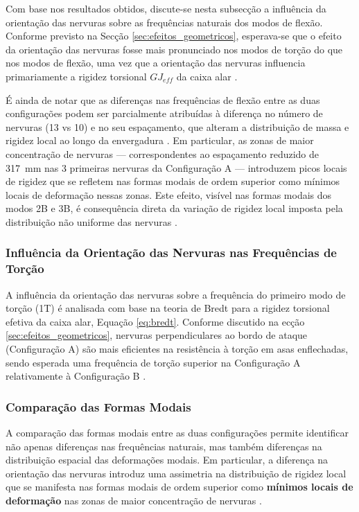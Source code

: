 \documentclass[a4paper,fleqn,noprintline]{cas-dc}
\begin{document}
Com base nos resultados obtidos, discute-se nesta subsecção a influência da orientação das nervuras sobre as frequências naturais dos modos de flexão. Conforme previsto na Secção \ref{sec:efeitos_geometricos}, esperava-se que o efeito da orientação das nervuras fosse mais pronunciado nos modos de torção do que nos modos de flexão, uma vez que a orientação das nervuras influencia primariamente a rigidez torsional $GJ_{eff}$ da caixa alar \cite{Megson2012, Niu1988}.

É ainda de notar que as diferenças nas frequências de flexão entre as duas configurações podem ser parcialmente atribuídas à diferença no número de nervuras (13 vs 10) e no seu espaçamento, que alteram a distribuição de massa e rigidez local ao longo da envergadura \cite{Craig2006}. Em particular, as zonas de maior concentração de nervuras --- correspondentes ao espaçamento reduzido de \SI{317}{\milli\meter} nas 3 primeiras nervuras da Configuração A --- introduzem picos locais de rigidez que se refletem nas formas modais de ordem superior como mínimos locais de deformação nessas zonas. Este efeito, visível nas formas modais dos modos 2B e 3B, é consequência direta da variação de rigidez local imposta pela distribuição não uniforme das nervuras \cite{Rao2011, Bathe2014}.

\subsubsection{Influência da Orientação das Nervuras nas 
Frequências de Torção}

A influência da orientação das nervuras sobre a frequência do primeiro modo de torção (1T) é analisada com base na teoria de Bredt para a rigidez torsional efetiva da caixa alar, Equação \eqref{eq:bredt}. Conforme discutido na 
ecção \ref{sec:efeitos_geometricos}, nervuras perpendiculares ao bordo de ataque (Configuração A) são mais eficientes na resistência à torção em asas enflechadas, sendo esperada uma frequência de torção superior na Configuração A relativamente à Configuração B \cite{Niu1988, Megson2012}.

\subsubsection{Comparação das Formas Modais}

A comparação das formas modais entre as duas configurações permite identificar não apenas diferenças nas frequências naturais, mas também diferenças na distribuição espacial das deformações modais. Em particular, a diferença na orientação das nervuras introduz uma assimetria na distribuição de rigidez local que se manifesta nas formas modais de ordem superior como \textbf{mínimos locais de deformação} nas zonas de maior concentração de nervuras \cite{Bathe2014, Cook2001}.
\end{document}
